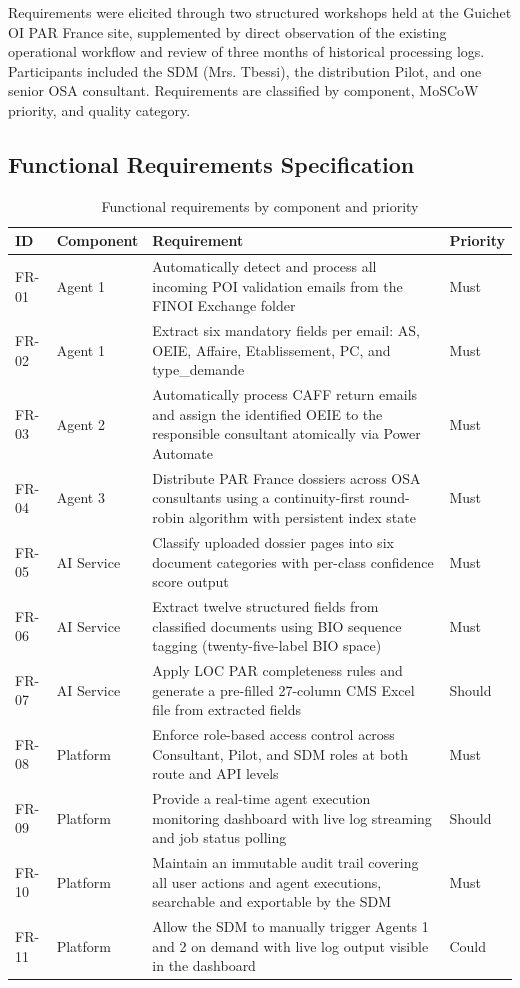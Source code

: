Requirements were elicited through two structured workshops held at the Guichet OI PAR France site, supplemented by direct observation of the existing operational workflow and review of three months of historical processing logs. Participants included the SDM (Mrs. Tbessi), the distribution Pilot, and one senior OSA consultant. Requirements are classified by component, MoSCoW priority, and quality category.

\subsection{Functional Requirements Specification}

\begin{table}[H]
  \centering
  \caption{Functional requirements by component and priority}
  \renewcommand{\arraystretch}{1.0}
  \footnotesize
  \begin{tabularx}{\textwidth}{|>{\raggedright\arraybackslash}p{2.3cm}|X|X|X|}
    \hline
    \textbf{ID} & \textbf{Component} & \textbf{Requirement} & \textbf{Priority} \\ \hline
    FR-01 & Agent 1 & Automatically detect and process all incoming POI validation emails from the FINOI Exchange folder & Must \\ \hline
    FR-02 & Agent 1 & Extract six mandatory fields per email: AS, OEIE, Affaire, Etablissement, PC, and type\_demande & Must \\ \hline
    FR-03 & Agent 2 & Automatically process CAFF return emails and assign the identified OEIE to the responsible consultant atomically via Power Automate & Must \\ \hline
    FR-04 & Agent 3 & Distribute PAR France dossiers across OSA consultants using a continuity-first round-robin algorithm with persistent index state & Must \\ \hline
    FR-05 & AI Service & Classify uploaded dossier pages into six document categories with per-class confidence score output & Must \\ \hline
    FR-06 & AI Service & Extract twelve structured fields from classified documents using BIO sequence tagging (twenty-five-label BIO space) & Must \\ \hline
    FR-07 & AI Service & Apply LOC PAR completeness rules and generate a pre-filled 27-column CMS Excel file from extracted fields & Should \\ \hline
    FR-08 & Platform & Enforce role-based access control across Consultant, Pilot, and SDM roles at both route and API levels & Must \\ \hline
    FR-09 & Platform & Provide a real-time agent execution monitoring dashboard with live log streaming and job status polling & Should \\ \hline
    FR-10 & Platform & Maintain an immutable audit trail covering all user actions and agent executions, searchable and exportable by the SDM & Must \\ \hline
    FR-11 & Platform & Allow the SDM to manually trigger Agents 1 and 2 on demand with live log output visible in the dashboard & Could \\ \hline
  \end{tabularx}
\end{table}

